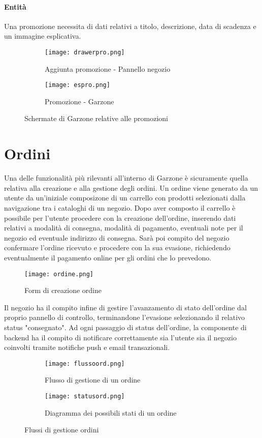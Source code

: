 \paragraph{Entità} Una promozione necessita di dati relativi a titolo, descrizione, data di scadenza e un immagine esplicativa.
\begin{figure}[h!]
    \begin{subfigure}{0.5\textwidth}
    \texttt{[image: drawerpro.png]} 
    \caption{Aggiunta promozione - Pannello negozio}
    \label{fig:subim1}
    \end{subfigure}
    \begin{subfigure}{0.5\textwidth}
    \texttt{[image: espro.png]}
    \caption{Promozione - Garzone}
    \label{fig:subim2}
    \end{subfigure}
    
    \caption{Schermate di Garzone relative alle promozioni}
    \label{fig:image2}
\end{figure}
\section{Ordini}
Una delle funzionalità più rilevanti all'interno di Garzone è sicuramente quella relativa alla creazione e alla gestione degli ordini. Un ordine viene generato da un utente da un'iniziale composizone di un carrello con prodotti selezionati dalla navigazione tra i cataloghi di un negozio. Dopo aver composto il carrello è possibile per l'utente procedere con la creazione dell'ordine, inserendo dati relativi a modalità di consegna, modalità di pagamento, eventuali note per il negozio ed eventuale indirizzo di consegna. Sarà poi compito del negozio confermare l'ordine ricevuto e procedere con la sua evasione, richiedendo eventualmente il pagamento online per gli ordini che lo prevedono. 
\begin{figure}[h!]
    \centering
    \texttt{[image: ordine.png]}
    \caption{Form di creazione ordine}
\end{figure}
Il negozio ha il compito infine di gestire l'avanzamento di stato dell'ordine dal proprio pannello di controllo, terminandone l'evasione selezionando il relativo status "consegnato". Ad ogni passaggio di status dell'ordine, la componente di backend ha il compito di notificare correttamente sia l'utente sia il negozio coinvolti tramite notifiche push e email transazionali. 
\begin{figure}[h!]
    \begin{subfigure}{0.5\textwidth}
    \texttt{[image: flussoord.png]}
    \caption{Flusso di gestione di un ordine}
    \label{fig:subim1}
    \end{subfigure}
    \begin{subfigure}{0.5\textwidth}
    \texttt{[image: statusord.png]}
    \caption{Diagramma dei possibili stati di un ordine}
    \label{fig:subim2}
    \end{subfigure}
    
    \caption{Flussi di gestione ordini}
    \label{fig:image2}
\end{figure}
\FloatBarrier
